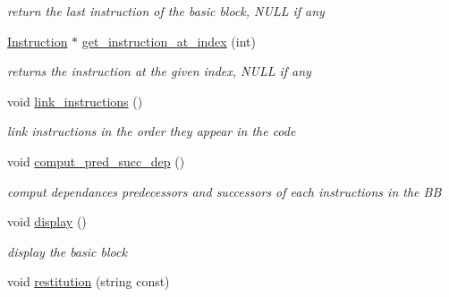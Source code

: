 \begin{DoxyCompactItemize}
\begin{DoxyCompactList}\small\item\em return the last instruction of the basic block, N\+U\+L\+L if any \end{DoxyCompactList}\item 
\hypertarget{class_basic__block_a84aa42e38e2494c2f8ab0a159dba3ca8}{\hyperlink{class_instruction}{Instruction} $\ast$ \hyperlink{class_basic__block_a84aa42e38e2494c2f8ab0a159dba3ca8}{get\+\_\+instruction\+\_\+at\+\_\+index} (int)}\label{class_basic__block_a84aa42e38e2494c2f8ab0a159dba3ca8}

\begin{DoxyCompactList}\small\item\em returns the instruction at the given index, N\+U\+L\+L if any \end{DoxyCompactList}\item 
\hypertarget{class_basic__block_ae53d18eb1436d162ee9ae565c46b35e5}{void \hyperlink{class_basic__block_ae53d18eb1436d162ee9ae565c46b35e5}{link\+\_\+instructions} ()}\label{class_basic__block_ae53d18eb1436d162ee9ae565c46b35e5}

\begin{DoxyCompactList}\small\item\em link instructions in the order they appear in the code \end{DoxyCompactList}\item 
\hypertarget{class_basic__block_a2f2cdedde41f78b7982e6d6d348524c2}{void \hyperlink{class_basic__block_a2f2cdedde41f78b7982e6d6d348524c2}{comput\+\_\+pred\+\_\+succ\+\_\+dep} ()}\label{class_basic__block_a2f2cdedde41f78b7982e6d6d348524c2}

\begin{DoxyCompactList}\small\item\em comput dependances predecessors and successors of each instructions in the B\+B \end{DoxyCompactList}\item 
\hypertarget{class_basic__block_aad79779b098ba4ccd1549a8dbbd80d7d}{void \hyperlink{class_basic__block_aad79779b098ba4ccd1549a8dbbd80d7d}{display} ()}\label{class_basic__block_aad79779b098ba4ccd1549a8dbbd80d7d}

\begin{DoxyCompactList}\small\item\em display the basic block \end{DoxyCompactList}\item 
\hypertarget{class_basic__block_af74c4eeeecfb7a3f3fddbeb2994523a4}{void \hyperlink{class_basic__block_af74c4eeeecfb7a3f3fddbeb2994523a4}{restitution} (string const)}\label{class_basic__block_af74c4eeeecfb7a3f3fddbeb2994523a4}


\end{DoxyCompactItemize}
